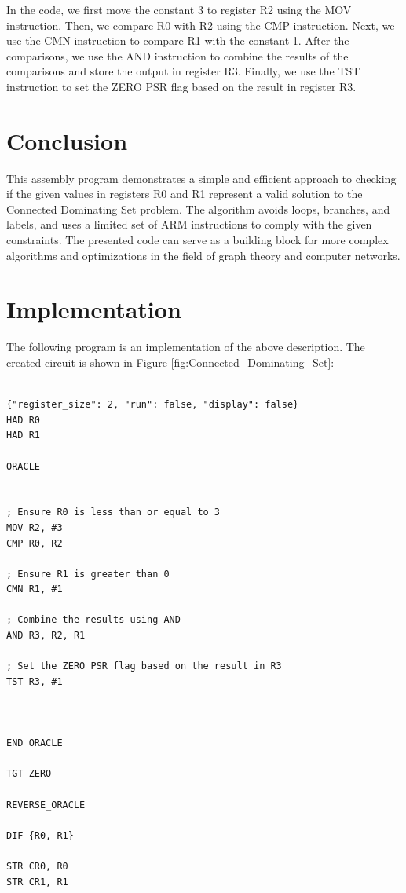 In the code, we first move the constant 3 to register R2 using the MOV instruction. Then, we compare R0 with R2 using the CMP instruction. Next, we use the CMN instruction to compare R1 with the constant 1. After the comparisons, we use the AND instruction to combine the results of the comparisons and store the output in register R3. Finally, we use the TST instruction to set the ZERO PSR flag based on the result in register R3.

\section{Conclusion}
This assembly program demonstrates a simple and efficient approach to checking if the given values in registers R0 and R1 represent a valid solution to the Connected Dominating Set problem. The algorithm avoids loops, branches, and labels, and uses a limited set of ARM instructions to comply with the given constraints. The presented code can serve as a building block for more complex algorithms and optimizations in the field of graph theory and computer networks.



\section{Implementation}

The following program is an implementation of the above description. The created circuit is shown in Figure \ref{fig:Connected_Dominating_Set}:

\begin{lstlisting}

{"register_size": 2, "run": false, "display": false}
HAD R0
HAD R1

ORACLE


; Ensure R0 is less than or equal to 3
MOV R2, #3
CMP R0, R2

; Ensure R1 is greater than 0
CMN R1, #1

; Combine the results using AND
AND R3, R2, R1

; Set the ZERO PSR flag based on the result in R3
TST R3, #1



END_ORACLE

TGT ZERO

REVERSE_ORACLE

DIF {R0, R1}

STR CR0, R0
STR CR1, R1


\end{lstlisting}

